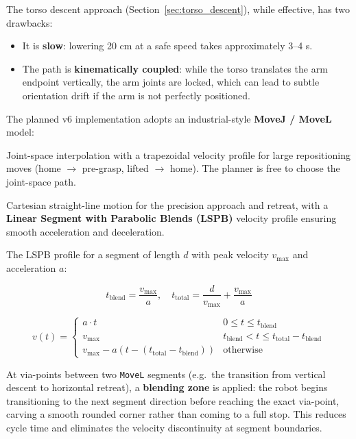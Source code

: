 The torso descent approach (Section~\ref{sec:torso_descent}), while effective, has
two drawbacks:
\begin{itemize}[noitemsep]
  \item It is \textbf{slow}: lowering 20 cm at a safe speed takes approximately 3--4 s.
  \item The path is \textbf{kinematically coupled}: while the torso translates the arm
        endpoint vertically, the arm joints are locked, which can lead to subtle
        orientation drift if the arm is not perfectly positioned.
\end{itemize}

The planned v6 implementation adopts an industrial-style \textbf{MoveJ / MoveL} model:

\begin{description}[noitemsep]
  \item[\texttt{MoveJ}] Joint-space interpolation with a trapezoidal velocity profile
        for large repositioning moves (home $\rightarrow$ pre-grasp, lifted
        $\rightarrow$ home). The planner is free to choose the joint-space path.
  \item[\texttt{MoveL}] Cartesian straight-line motion for the precision approach and
        retreat, with a \textbf{Linear Segment with Parabolic Blends (LSPB)} velocity
        profile ensuring smooth acceleration and deceleration.
\end{description}

The LSPB profile for a segment of length $d$ with peak velocity $v_{\max}$ and
acceleration $a$:

\begin{equation}
  t_{\text{blend}} = \frac{v_{\max}}{a}, \quad
  t_{\text{total}} = \frac{d}{v_{\max}} + \frac{v_{\max}}{a}
\end{equation}

\[
  v(t) =
  \begin{cases}
    a \cdot t & 0 \leq t \leq t_{\text{blend}} \\
    v_{\max}  & t_{\text{blend}} < t \leq t_{\text{total}} - t_{\text{blend}} \\
    v_{\max} - a(t - (t_{\text{total}} - t_{\text{blend}})) & \text{otherwise}
  \end{cases}
\]

At via-points between two \texttt{MoveL} segments (e.g.\ the transition from vertical
descent to horizontal retreat), a \textbf{blending zone} is applied: the robot begins
transitioning to the next segment direction before reaching the exact via-point,
carving a smooth rounded corner rather than coming to a full stop.
This reduces cycle time and eliminates the velocity discontinuity at segment
boundaries.

